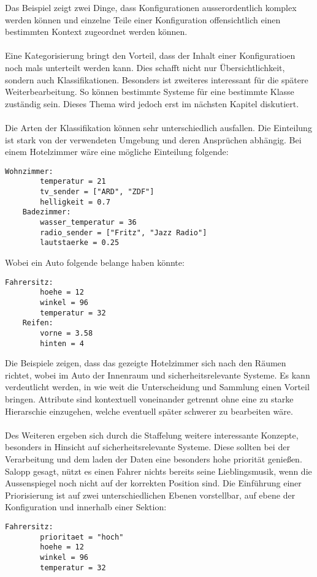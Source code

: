Das Beispiel zeigt zwei Dinge, dass Konfigurationen ausserordentlich komplex werden können und einzelne Teile einer Konfiguration offensichtlich einen bestimmten Kontext zugeordnet werden können. 
\\\\
Eine Kategorisierung bringt den Vorteil, dass der Inhalt einer Konfiguratioen noch mals unterteilt werden kann. Dies schafft nicht nur Übersichtlichkeit, sondern auch Klassifikationen. Besonders ist zweiteres interessant für die spätere Weiterbearbeitung. So können bestimmte Systeme für eine bestimmte Klasse zuständig sein. Dieses Thema wird jedoch erst im nächsten Kapitel diskutiert. 
\\\\
Die Arten der Klassifikation können sehr unterschiedlich ausfallen. Die Einteilung ist stark von der verwendeten Umgebung und deren Ansprüchen abhängig. Bei einem Hotelzimmer wäre eine mögliche Einteilung folgende: 

\lstset{language=bash}
\begin{lstlisting}[caption=Mögliche Sektionen innerhalb einer Hotelkonfiguratione, captionpos=b]
  Wohnzimmer: 
		temperatur = 21
		tv_sender = ["ARD", "ZDF"]
		helligkeit = 0.7
	Badezimmer: 
		wasser_temperatur = 36
		radio_sender = ["Fritz", "Jazz Radio"]
		lautstaerke = 0.25
\end{lstlisting}

Wobei ein Auto folgende belange haben könnte:

\lstset{language=bash}
\begin{lstlisting}[caption=Mögliche Sektionen innerhalb einer KFZ-Konfiguration, captionpos=b]
   	Fahrersitz:
		hoehe = 12
		winkel = 96
		temperatur = 32
	Reifen: 
		vorne = 3.58
		hinten = 4
\end{lstlisting}


Die Beispiele zeigen, dass das gezeigte Hotelzimmer sich nach den Räumen richtet, wobei im Auto der Innenraum und sicherheitsrelevante Systeme. Es kann verdeutlicht werden, in wie weit die Unterscheidung und Sammlung einen Vorteil bringen. Attribute sind kontextuell voneinander getrennt ohne eine zu starke Hierarschie einzugehen, welche eventuell später schwerer zu bearbeiten wäre.
\\\\
Des Weiteren ergeben sich durch die Staffelung weitere interessante Konzepte, besonders in Hinsicht auf sicherheitsrelevante Systeme. Diese sollten bei der Verarbeitung und dem laden der Daten eine besonders hohe priorität genießen. Salopp gesagt, nützt es einen Fahrer nichts bereits seine Lieblingsmusik, wenn die Aussenspiegel noch nicht auf der korrekten Position sind. Die Einführung einer Priorisierung ist auf zwei unterschiedlichen Ebenen vorstellbar, auf ebene der Konfiguration und innerhalb einer Sektion: 
\lstset{language=bash}
\begin{lstlisting}[caption=Priorisierung von Sektionen, captionpos=b]
   	Fahrersitz:
		prioritaet = "hoch"
		hoehe = 12
		winkel = 96
		temperatur = 32
\end{lstlisting}


